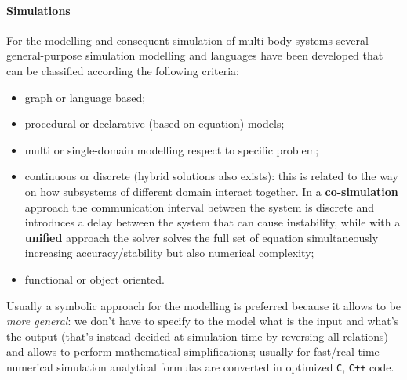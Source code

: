 	\paragraph{Simulations} For the modelling and consequent simulation of multi-body systems several general-purpose simulation modelling and languages have been developed that can be classified according the following criteria:
	\begin{itemize}
		\item graph or language based;
		\item procedural or declarative (based on equation) models;
		\item multi or single-domain modelling respect to specific problem;
		\item continuous or discrete (hybrid solutions also exists): this is related to the way on how subsystems of different domain interact together. In a \textbf{co-simulation} approach the communication interval between the system is discrete and introduces a delay between the system that can cause instability, while with a \textbf{unified} approach the solver solves the full set of equation simultaneously increasing accuracy/stability but also numerical complexity;
		\item functional or object oriented.
	\end{itemize}
	
	Usually a symbolic approach for the modelling is preferred because it allows to be \textit{more general}: we don't have to specify to the model what is the input and what's the output (that's instead decided at simulation time by reversing all relations) and allows to perform mathematical simplifications; usually for fast/real-time numerical simulation analytical formulas are converted in optimized \texttt C, \texttt{C++} code.
	
	
	
	
	
	
	
	
	
	
	
	
	
	
	
	
	
	
	
	
	
